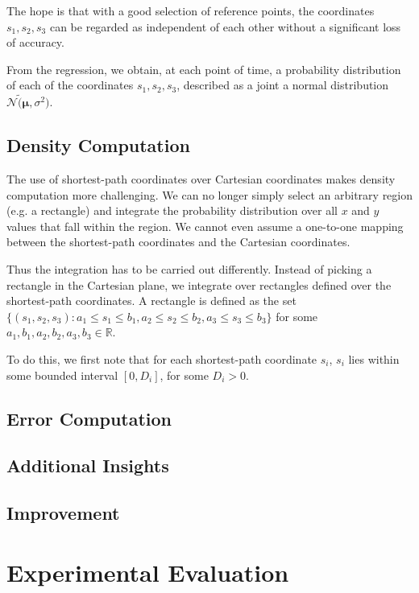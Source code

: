\documentclass[letterpaper]{article}
\begin{document}
The hope is that with a good selection of reference points, the coordinates $s_1, s_2, s_3$ can be regarded as independent of each other without a significant loss of accuracy.

From the regression, we obtain, at each point of time, a probability distribution of each of the coordinates $s_1, s_2, s_3$, described as a joint a normal distribution $\mathcal{N}\tilde (\boldsymbol{\mu},\sigma^2)$.

\subsection{Density Computation}

The use of shortest-path coordinates over Cartesian coordinates makes density computation more challenging. We can no longer simply select an arbitrary region (e.g. a rectangle) and integrate the probability distribution over all $x$ and $y$ values that fall within the region. We cannot even assume a one-to-one mapping between the shortest-path coordinates and the Cartesian coordinates.

Thus the integration has to be carried out differently. Instead of picking a rectangle in the Cartesian plane, we integrate over rectangles defined over the shortest-path coordinates. A rectangle is defined as the set $\{(s_1,s_2,s_3) : a_1\leq s_1\leq b_1, a_2\leq s_2\leq b_2, a_3\leq s_3\leq b_3\}$ for some $a_1,b_1,a_2,b_2,a_3,b_3 \in \mathbb{R}$.

To do this, we first note that for each shortest-path coordinate $s_i$, $s_i$ lies within some bounded interval $[0,D_i]$, for some $D_i > 0$.



\subsection{Error Computation}


\subsection{Additional Insights}


\subsection{Improvement}



\section{Experimental Evaluation}
\end{document}
